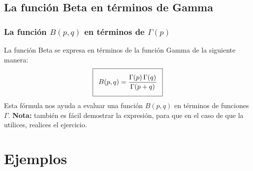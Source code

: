 \documentclass[12pt]{beamer}
\begin{document}
\subsection{La función Beta en términos de Gamma}
\begin{frame}
\frametitle{La función $B(p, q)$ en términos de $\Gamma (p)$}
La función Beta se expresa en términos de la función Gamma de la siguiente manera:
\begin{align}
\addtolength{\fboxsep}{5pt}\boxed{B(p, q) = \dfrac{\Gamma(p) \, \Gamma(q)}{\Gamma (p + q)}}
\label{eq:ecuacion_07_01}
\end{align}
Esta fórmula nos ayuda a evaluar una función $B (p, q)$ en términos de funciones $\Gamma$. \textbf{Nota: } también es fácil demostrar la expresión, para que en el caso de que la utilices, realices el ejercicio.
\end{frame}
\section{Ejemplos}
\end{document}
